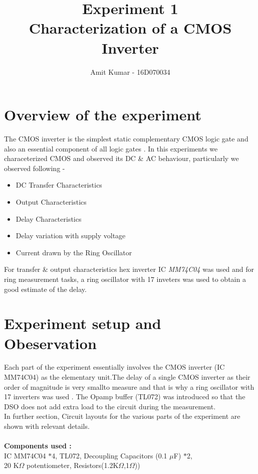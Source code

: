 \documentclass[12pt]{article}
\title{\textbf{
Experiment 1} \\ \textbf{Characterization of a CMOS
Inverter} }
\author{Amit Kumar - 16D070034}
\begin{document}
\maketitle

\section{Overview of the experiment
}
The CMOS inverter is the simplest static complementary CMOS logic gate and also an essential component of all logic gates . In this experiments we characeterized CMOS and observed its DC \& AC behaviour, particularly we observed following -
\begin{itemize}
\item DC Transfer Characteristics
\item Output Characteristics
\item Delay Characteristics
\item Delay variation with supply voltage
\item Current drawn by the Ring Oscillator
\end{itemize}

For transfer \& output characteristics hex inverter IC {\em MM74C04} was used and for ring measurement tasks, a ring oscillator with 17 inveters was used to obtain a good estimate of the delay.

\section{Experiment setup and Obeservation}

Each part of the experiment essentially involves the CMOS inverter (IC MM74C04) as the elementary unit.The delay of a single CMOS inverter as their order of magnitude is very smallto measure and that is why a ring oscillator with 17 inverters was used . The Opamp buffer (TL072) was introduced so that the DSO does not add extra load to the circuit during the measurement.
\\ In further section, Circuit layouts for the various parts of the experiment are shown with relevant details.\\ \\
\textbf{Components used :} \\
IC MM74C04 $*$4, TL072, Decoupling Capacitors (0.1 $\mu$F) $*$2,\\20 K$\Omega$ potentiometer, Resistors(1.2K$\Omega$,1$\Omega$))
\end{document}
